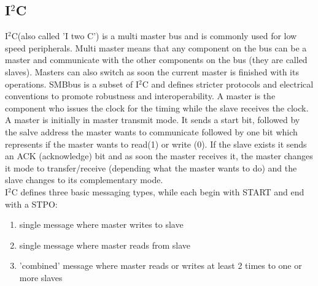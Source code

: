 \documentclass[a4paper]{scrartcl}
\begin{document}
        \subsection{I\(^2\)C}     
            I\(^2\)C(also called 'I two C') is a multi master bus and is commonly used for low speed peripherals. Multi master means that any component on the bus can be a
            master and communicate with the other components on the bus (they are called slaves). Masters can also switch as soon the current master is finished with its
            operations. SMBbus is a subset of I\(^2\)C and defines stricter protocols and electrical conventions to promote robustness and interoperability. A master is 
            the component who issues the clock for the timing while the slave receives the clock. \\
            A master is initially in master transmit mode. It sends a start bit, followed by the salve address the master wants to communicate followed by one bit which 
            represents if the master wants to read(1) or write (0). If the slave exists it sends an ACK (acknowledge) bit and as soon the master receives it, the master changes
            it mode to transfer/receive (depending what the master wants to do) and the slave changes to its complementary mode. \\
            I\(^2\)C defines three basic messaging types, while each begin with START and end with a STPO:
            \begin{enumerate}
                \item single message where master writes to slave
                \item single message where master reads from slave
                \item 'combined' message where master reads or writes at least 2 times to one or more slaves
            \end{enumerate}
\end{document}
